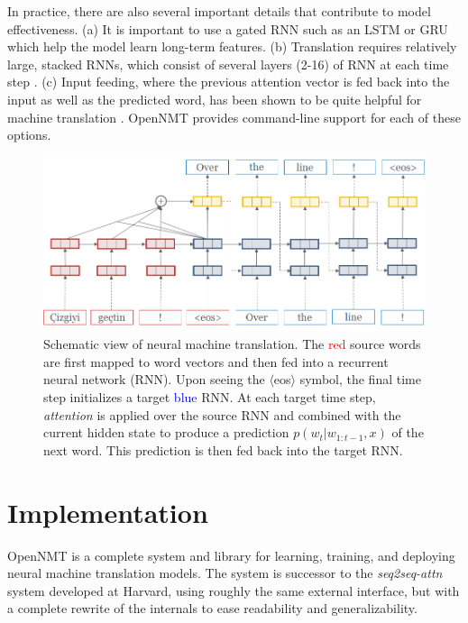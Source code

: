 \documentclass[11pt]{article}
\begin{document}
In practice, there are also several important details that contribute to model effectiveness. (a) It is important to use a gated RNN such as an LSTM \cite{} or GRU \cite{} which help the model learn long-term features. (b) Translation requires relatively large, stacked RNNs, which consist of several layers (2-16) of RNN at each time step \cite{}. (c) Input feeding, where the previous attention vector is fed back into the input as well as the predicted word, has been shown to be quite helpful for machine translation \cite{}. OpenNMT provides command-line support for each of these options.



\begin{figure}
  \centering
  \includegraphics[width=\linewidth]{simple-attn}
  \caption{Schematic view of neural machine translation. The \textcolor{red}{red} source words are first mapped to word vectors and then fed into a recurrent neural network (RNN). Upon seeing the $\langle$eos$\rangle$ symbol, the final time step initializes a target \textcolor{blue}{blue} RNN. At each target time step, \textit{attention} is applied over the source RNN and combined with the current hidden state to produce a prediction $p(w_t| w_{1: t-1}, x)$ of the next word. This prediction is then fed back into the target RNN.}
\end{figure}



\section{Implementation}


OpenNMT is a complete system and library for learning, training, and
deploying neural machine translation models. The system is successor to
the \textit{seq2seq-attn} system developed at Harvard, using roughly
the same external interface, but with a complete rewrite of the
internals to ease readability and generalizability. 
\end{document}
